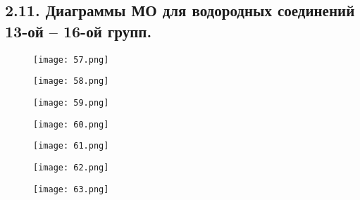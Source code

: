 
\subsection{2.11. Диаграммы МО для водородных соединений 13-ой – 16-ой групп.} 

\par\bigskip

\begin{figure}[H]
	\centering
	{\texttt{[image: 57.png]}}
\end{figure}

\begin{figure}[H]
	\centering
	{\texttt{[image: 58.png]}}
\end{figure}

\begin{figure}[H]
	\centering
	{\texttt{[image: 59.png]}}
\end{figure}

\begin{figure}[H]
	\centering
	{\texttt{[image: 60.png]}}
\end{figure}

\begin{figure}[H]
	\centering
	{\texttt{[image: 61.png]}}
\end{figure}

\begin{figure}[H]
	\centering
	{\texttt{[image: 62.png]}}
\end{figure}

\begin{figure}[H]
	\centering
	{\texttt{[image: 63.png]}}
\end{figure}


\par\bigskip
\par\bigskip